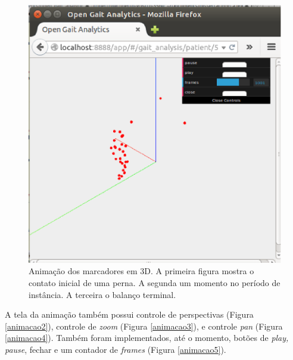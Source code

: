 \begin{figure}[H]
\begin{minipage}[b]{0.32\textwidth}
  \end{minipage}
  \hfill
  \begin{minipage}[b]{0.32\textwidth}
    \includegraphics[width=\textwidth]{figuras/tela10.eps}
  \end{minipage}
  \caption[Animação dos marcadores em 3D.]{Animação dos marcadores em 3D. A primeira figura mostra o contato inicial de uma perna. A segunda um momento no período de instância. A terceira o balanço terminal.}
  \label{animacao1}
\end{figure}


A tela da animação também possui controle de perspectivas 
(Figura \ref{animacao2}), controle de \emph{zoom} (Figura \ref{animacao3}), 
e controle \emph{pan} (Figura \ref{animacao4}).
Também foram implementados, até o momento, botões de \emph{play, pause}, fechar e um contador de \emph{frames} (Figura \ref{animacao5}).

